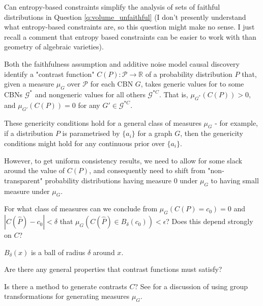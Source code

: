 \begin{question}
    Can entropy-based constraints simplify the analysis of sets of faithful distributions in Question \ref{q:volume_unfaithful} (I don't presently understand what entropy-based constraints are, so this question might make no sense. I just recall a comment that entropy based constraints can be easier to work with than geometry of algebraic varieties).
\end{question}

Both the faithfulness assumption and additive noise model causal discovery identify a "contrast function" $C(P):\mathcal{P}\to\mathbb{R}$ of a probability distribution $P$ that, given a measure $\mu_G$ over $\mathcal{P}$ for each CBN $G$, takes generic values for to some CBNs $\mathcal{G}^*$ and nongeneric values for all others $\mathcal{G}^{*C}$. That is, $\mu_{G^*}(C(P))>0$, and $\mu_{G'}(C(P))=0$ for any $G'\in\mathcal{G}^{*C}$.

\begin{question}\label{q:generalised_genericity}
    These genericity conditions hold for a general class of measures $\mu_G$ - for example, if a distribution $P$ is parametrised by $\{a_i\}$ for a graph $G$, then the genericity conditions might hold for any continuous prior over $\{a_i\}$.
    
    However, to get uniform consistency results, we need to allow for some slack around the value of $C(P)$, and consequently need to shift from "non-transparent" probability distributions having measure 0 under $\mu_G$ to having small measure under $\mu_G$.
    
    For what class of measures can we conclude from $\mu_G(C(P)=c_0)=0$ and $|C(\hat{P})-c_0|<\delta$ that $\mu_G(C(\hat{P})\in B_\delta (c_0)) < \epsilon$? Does this depend strongly on $C$?
    
    $B_\delta(x)$ is a ball of radius $\delta$ around $x$.
\end{question}
    
\begin{question}
    Are there any general properties that contrast functions must satisfy?
\end{question}

\begin{question}
    Is there a method to generate contrasts $C$? See \cite{besserve_group_2017} for a discussion of using group transformations for generating measures $\mu_G$.
\end{question}


